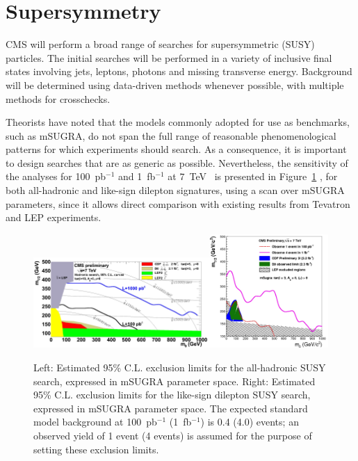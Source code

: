 \documentclass{cmspaper}
\begin{document}
\section{Supersymmetry}
CMS will perform a broad range of searches for supersymmetric (SUSY) particles. The initial searches
will be performed in a variety of inclusive final states involving jets, leptons, photons and missing 
transverse energy. Background will be determined using data-driven  methods whenever possible, with multiple 
methods for crosschecks. 

Theorists have noted that the models commonly adopted for use as benchmarks, such as mSUGRA, 
do not span the full range of reasonable phenomenological patterns for which experiments should search.
As a consequence, it is important to design searches that are as generic as possible.
Nevertheless, the sensitivity of the analyses for 100~pb$^{-1}$ and 1~fb$^{-1}$ 
at $7$~TeV~\cite{CMSPhysicsReach7TeV} is presented in Figure~\ref{fig:SUSY} 
, for both all-hadronic and like-sign dilepton signatures, using a scan over mSUGRA parameters,  
since it allows direct comparison with existing results from Tevatron and LEP experiments.

\begin{figure}[htbp] 
\centering
\includegraphics[width=0.6\textwidth]{SUSY_Fig1.jpg}\includegraphics[width=0.4\textwidth]{SUSY_Fig2.jpg}  
\caption{Left: Estimated 95\% C.L. exclusion limits for the all-hadronic SUSY search, expressed in mSUGRA 
parameter space. Right: Estimated 95\% C.L. exclusion limits for the like-sign dilepton SUSY search, 
expressed in mSUGRA parameter space. The expected standard model background at 100~pb$^{-1}$ (1~fb$^{-1}$) 
is 0.4 (4.0) events; an observed yield of 1 event (4 events) is assumed for the purpose of setting these exclusion limits.}
\label{fig:SUSY}
\end{figure}
\end{document}
